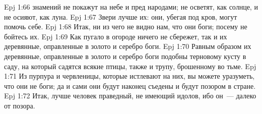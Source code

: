 \vs Epj 1:66 знамений не покажут на небе и пред народами; не осветят, как солнце, и не осияют, как луна.
\vs Epj 1:67 Звери лучше их: они, убегая под кров, могут помочь себе.
\vs Epj 1:68 Итак, ни из чего не видно нам, что они боги; посему не бойтесь их.
\vs Epj 1:69 Как пугало в огороде ничего не сбережет, так и их деревянные, оправленные в золото и серебро боги.
\vs Epj 1:70 Равным образом их деревянные, оправленные в золото и серебро боги подобны терновому кусту в саду, на который садятся всякие птицы, также и трупу, брошенному во тьме.
\vs Epj 1:71 Из пурпура и червленицы, которые истлевают на них, вы можете уразуметь, что они не боги; да и сами они будут наконец съедены и будут позором в стране.
\rsbpar\vs Epj 1:72 Итак, лучше человек праведный, не имеющий идолов, ибо он~--- далеко от позора.
